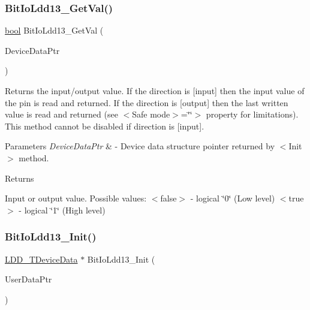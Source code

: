 \subsubsection{\texorpdfstring{Bit\+Io\+Ldd13\+\_\+\+Get\+Val()}{BitIoLdd13\_GetVal()}}
{\footnotesize\ttfamily \hyperlink{group___p_e___types__module_ga97a80ca1602ebf2303258971a2c938e2}{bool} Bit\+Io\+Ldd13\+\_\+\+Get\+Val (\begin{DoxyParamCaption}\item[{\hyperlink{group___p_e___types__module_gac5cf1362f1f0e3a2ce71b1bf2276d091}{L\+D\+D\+\_\+\+T\+Device\+Data} $\ast$}]{Device\+Data\+Ptr }\end{DoxyParamCaption})}



Returns the input/output value. If the direction is \mbox{[}input\mbox{]} then the input value of the pin is read and returned. If the direction is \mbox{[}output\mbox{]} then the last written value is read and returned (see $<$\+Safe mode$>$=\char`\"{}\char`\"{}$>$ property for limitations). This method cannot be disabled if direction is \mbox{[}input\mbox{]}. 


\begin{DoxyParams}{Parameters}
{\em Device\+Data\+Ptr} & -\/ Device data structure pointer returned by $<$\+Init$>$ method. \\
\hline
\end{DoxyParams}
\begin{DoxyReturn}{Returns}

\begin{DoxyItemize}
\item Input or output value. Possible values\+: $<$false$>$ -\/ logical \char`\"{}0\char`\"{} (Low level) $<$true$>$ -\/ logical \char`\"{}1\char`\"{} (High level) 
\end{DoxyItemize}
\end{DoxyReturn}
\mbox{\label{group___bit_io_ldd13__module_gab5711f568b658b5736ddc29999cf938b}} 
\subsubsection{\texorpdfstring{Bit\+Io\+Ldd13\+\_\+\+Init()}{BitIoLdd13\_Init()}}
{\footnotesize\ttfamily \hyperlink{group___p_e___types__module_gac5cf1362f1f0e3a2ce71b1bf2276d091}{L\+D\+D\+\_\+\+T\+Device\+Data} $\ast$ Bit\+Io\+Ldd13\+\_\+\+Init (\begin{DoxyParamCaption}\item[{\hyperlink{group___p_e___types__module_ga0b66a73f87238a782318aa0be7578e35}{L\+D\+D\+\_\+\+T\+User\+Data} $\ast$}]{User\+Data\+Ptr }\end{DoxyParamCaption})}



